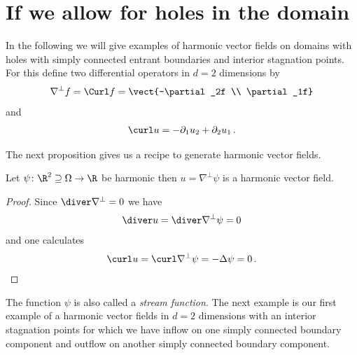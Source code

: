 \section{If we allow for holes in the domain}

In the following we will give examples of harmonic vector fields on domains with holes
with simply connected entrant boundaries
and interior stagnation points.
For this define two differential operators in $d=2$ dimensions by
\begin{align}
  \nabla^\perp f=\Curl f=\vect{-\partial_2f \\ \partial_1f}\label{eq:n2_nablaPerp}
\end{align}
and
\begin{align*}
  \curl u=-\partial_1u_2+\partial_2u_1\,.
\end{align*}

The next proposition gives us a recipe to generate harmonic vector fields.
\begin{proposition}
  Let $\psi\colon\R^2\supseteq\Omega\to\R$ be harmonic then $u=\nabla^\perp\psi$ is a harmonic vector field.
\end{proposition} 
\begin{proof}
  Since $\diver \nabla^\perp=0$ we have
  \begin{align*}
    \diver u = \diver\nabla^\perp \psi=0
  \end{align*}
  and one calculates
  \begin{align*}
    \curl u = \curl\nabla^\perp \psi = -\Delta \psi = 0\,.
  \end{align*}
\end{proof}
The function $\psi$ is also called a \emph{stream function}.
The next example is our first example of a harmonic vector fields
in $d=2$ dimensions with an interior stagnation points for which 
we have inflow on one simply connected boundary component and outflow on another simply connected boundary
component.

